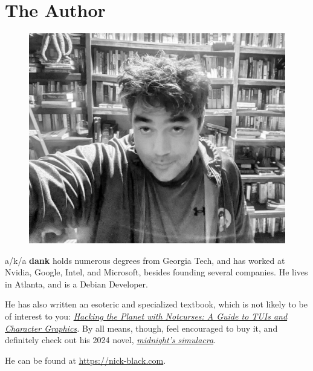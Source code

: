 \clearpage
\openany
\pagestyle{empty}
\chapter{The Author}
\begin{figure}[!tbp]
  \centering
  \includegraphics[width=\textwidth]{images/arrayfire.jpg}
\end{figure}
\bigskip
\begin{center}
\end{center}
\noindent\textbf{\theauthor} a/k/a \textbf{dank} holds numerous degrees from Georgia Tech, and has worked
at Nvidia, Google, Intel, and Microsoft, besides founding several companies.
He lives in Atlanta, and is a Debian Developer.

\noindent{}He has also written an esoteric and specialized textbook, which is not
 likely to be of interest to you: \textit{\href{https://www.amazon.com/Hacking-Planet-Notcurses-Character-Graphics/dp/B086PNVNC9}{Hacking the Planet with Notcurses: A Guide to TUIs and Character Graphics}.}
By all means, though, feel encouraged to buy it,
 and definitely check out his 2024 novel, \textit{\href{https://www.amazon.com/midnights-simulacra-Nick-Black/dp/B0CSVJZB4R}{midnight's simulacra}}.

\bigskip\noindent{}He can be found at \url{https://nick-black.com}.
